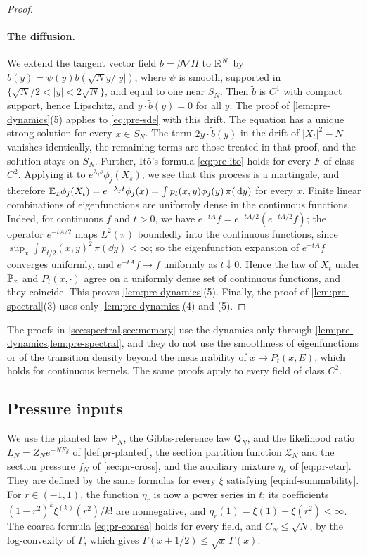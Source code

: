 \begin{proof}
\paragraph{The diffusion.} We extend the tangent vector field $b=\beta\nabla H$ to $\mathbb R^N$ by $\tilde b(y)=\psi(y)b(\sqrt Ny/|y|)$, where $\psi$ is smooth, supported in $\{\sqrt N/2<|y|<2\sqrt N\}$, and equal to one near $S_N$. Then $\tilde b$ is $C^1$ with compact support, hence Lipschitz, and $y\cdot\tilde b(y)=0$ for all $y$. The proof of \cref{lem:pre-dynamics}(5) applies to \eqref{eq:pre-sde} with this drift. The equation has a unique strong solution for every $x\in S_N$. The term $2y\cdot\tilde b(y)$ in the drift of $|X_t|^2-N$ vanishes identically, the remaining terms are those treated in that proof, and the solution stays on $S_N$. Further, It\^o's formula \eqref{eq:pre-ito} holds for every $F$ of class $C^2$. Applying it to $e^{\lambda_js}\phi_j(X_s)$, we see that this process is a martingale, and therefore $\mathbb E_x\phi_j(X_t)=e^{-\lambda_jt}\phi_j(x)=\int p_t(x,y)\phi_j(y)\,\pi(\,\mathrm d y)$ for every $x$. Finite linear combinations of eigenfunctions are uniformly dense in the continuous functions. Indeed, for continuous $f$ and $t>0$, we have $e^{-tA}f=e^{-tA/2}(e^{-tA/2}f)$; the operator $e^{-tA/2}$ maps $L^2(\pi)$ boundedly into the continuous functions, since $\sup_x\int p_{t/2}(x,y)^2\,\pi(\dd y)<\infty$; so the eigenfunction expansion of $e^{-tA}f$ converges uniformly, and $e^{-tA}f\to f$ uniformly as $t\downarrow0$. Hence the law of $X_t$ under $\mathbb P_x$ and $P_t(x,\cdot)$ agree on a uniformly dense set of continuous functions, and they coincide. This proves \cref{lem:pre-dynamics}(5). Finally, the proof of \cref{lem:pre-spectral}(3) uses only \cref{lem:pre-dynamics}(4) and (5).
\end{proof}

The proofs in \cref{sec:spectral,sec:memory} use the dynamics only through \cref{lem:pre-dynamics,lem:pre-spectral}, and they do not use the smoothness of eigenfunctions or of the transition density beyond the measurability of $x\mapsto P_t(x,E)$, which holds for continuous kernels. The same proofs apply to every field of class $C^2$.

\subsection{Pressure inputs}\label{sec:inf-pressure}

We use the planted law $\mathsf P_N$, the Gibbs-reference law $\mathsf Q_N$, and the likelihood ratio $L_N=Z_Ne^{-NF_\beta}$ of \cref{def:pr-planted}, the section partition function $\mathcal Z_N$ and the section pressure $f_N$ of \cref{sec:pr-cross}, and the auxiliary mixture $\eta_r$ of \eqref{eq:pr-etar}. They are defined by the same formulas for every $\xi$ satisfying \eqref{eq:inf-summability}. For $r\in(-1,1)$, the function $\eta_r$ is now a power series in $t$; its coefficients $(1-r^2)^k\xi^{(k)}(r^2)/k!$ are nonnegative, and $\eta_r(1)=\xi(1)-\xi(r^2)<\infty$. The coarea formula \eqref{eq:pr-coarea} holds for every field, and $C_N\le\sqrt N$, by the log-convexity of $\Gamma$, which gives $\Gamma(x+1/2)\le\sqrt x\,\Gamma(x)$.

